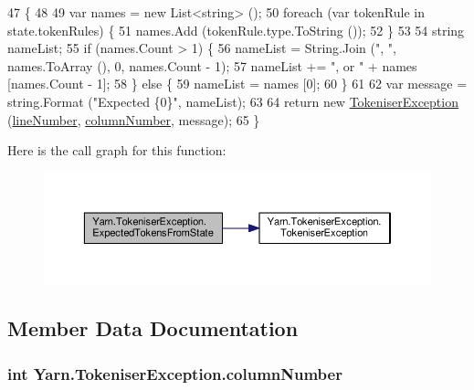 \begin{DoxyCode}
47                                                                                                            
                       \{
48 
49             var names = \textcolor{keyword}{new} List<string> ();
50             \textcolor{keywordflow}{foreach} (var tokenRule \textcolor{keywordflow}{in} state.tokenRules) \{
51                 names.Add (tokenRule.type.ToString ());
52             \}
53 
54             \textcolor{keywordtype}{string} nameList;
55             \textcolor{keywordflow}{if} (names.Count > 1) \{
56                 nameList = String.Join (\textcolor{stringliteral}{", "}, names.ToArray (), 0, names.Count - 1);
57                 nameList += \textcolor{stringliteral}{", or "} + names [names.Count - 1];
58             \} \textcolor{keywordflow}{else} \{
59                 nameList = names [0];
60             \}
61 
62             var message = string.Format (\textcolor{stringliteral}{"Expected \{0\}"}, nameList);
63 
64             \textcolor{keywordflow}{return} \textcolor{keyword}{new} \hyperlink{a00168_ad00fcf742d2b0d476ce43b27a3f3b6c1}{TokeniserException} (\hyperlink{a00168_a54b936d7b4f26f88a07a66c5fc1d1ad1}{lineNumber}, 
      \hyperlink{a00168_aabf2ad38f3984297c1daede9be55e3d6}{columnNumber}, message);
65         \}
\end{DoxyCode}


Here is the call graph for this function\-:
\nopagebreak
\begin{figure}[H]
\begin{center}
\leavevmode
\includegraphics[width=350pt]{a00168_af88cfa5eafdee355e1abb67e358497bd_cgraph}
\end{center}
\end{figure}




\subsection{Member Data Documentation}
\hypertarget{a00168_aabf2ad38f3984297c1daede9be55e3d6}{
\subsubsection[{column\-Number}]{\setlength{\rightskip}{0pt plus 5cm}int Yarn.\-Tokeniser\-Exception.\-column\-Number}}\label{a00168_aabf2ad38f3984297c1daede9be55e3d6}


